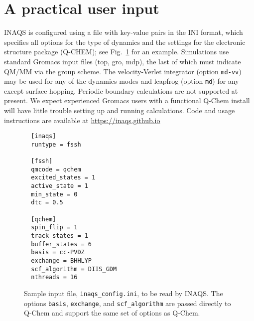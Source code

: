 \documentclass[journal=jctcce,manuscript=article,layout=traditional]{achemso}
\newcommand{\fig}[1]{Fig.~\ref{#1}}
\begin{document}
\section{A practical user input}\label{sec:usage}
INAQS is configured using a file with key-value pairs in the INI format, which specifies all options for the type of dynamics and the settings for the electronic structure package (Q-CHEM); see \fig{fig:inaqsconfig} for an example.
Simulations use standard Gromacs input files (top, gro, mdp), the last of which  must indicate QM/MM via the group scheme.
The velocity-Verlet integrator (option \texttt{md-vv}) may be used for any of the dynamics modes and leapfrog (option \texttt{md}) for any except surface hopping.
Periodic boundary calculations are not supported at present.
We expect experienced Gromacs users with a functional Q-Chem install will have little trouble setting up and running calculations.
Code and usage instructions are available at \url{https://inaqs.github.io}

\begin{figure}
\begin{verbatim}
  [inaqs]
  runtype = fssh

  [fssh]
  qmcode = qchem
  excited_states = 1
  active_state = 1
  min_state = 0
  dtc = 0.5

  [qchem]
  spin_flip = 1
  track_states = 1
  buffer_states = 6
  basis = cc-PVDZ
  exchange = BHHLYP
  scf_algorithm = DIIS_GDM
  nthreads = 16
\end{verbatim}
\caption{Sample input file, \texttt{inaqs\_config.ini}, to be read by INAQS. The options \texttt{basis}, \texttt{exchange}, and \texttt{scf\_algorithm} are passed directly to Q-Chem and support the same set of options as Q-Chem.}
\label{fig:inaqsconfig}
\end{figure}
%
%
%
%
%
%

%
%
%
%
%

\end{document}
